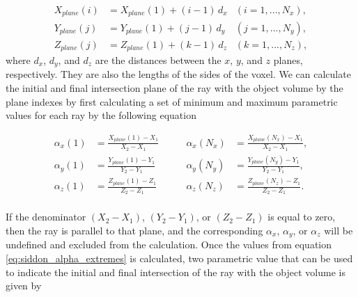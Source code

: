 \begin{equation}
	\begin{aligned}
		X_{plane}(i) & = X_{plane}(1) + (i-1)\, d_x 	&(i = 1, ..., N_x),\\ 
		Y_{plane}(j) & = Y_{plane}(1) + (j-1)\, d_y  	&(j = 1, ..., N_y),\\
		Z_{plane}(j) & = Z_{plane}(1) + (k-1)\, d_z		&(k = 1, ..., N_z),
	\end{aligned}
	\label{eq:siddon_planes}
\end{equation}
where $d_x$, $d_y$, and $d_z$ are the distances between the $x$, $y$, and $z$ planes, respectively.  They are also the lengths of the sides of the voxel.  We can calculate the initial and final intersection plane of the ray with the object volume by the plane indexes by first calculating a set of minimum and maximum parametric values for each ray by the following equation

\begin{equation}
\begin{aligned}
\alpha_x(1) &= \frac{X_{plane}(1) - X_1}{X_2 - X_1} \qquad &\alpha_x(N_x) &= \frac{X_{plane}(N_x) - X_1}{X_2 - X_1}, \\
\alpha_y(1) &= \frac{Y_{plane}(1) - Y_1}{Y_2 - Y_1} \qquad &\alpha_y(N_y) &= \frac{Y_{plane}(N_y) - Y_1}{Y_2 - Y_1}, \\
\alpha_z(1) &= \frac{Z_{plane}(1) - Z_1}{Z_2 - Z_1} \qquad &\alpha_z(N_z) &= \frac{Z_{plane}(N_z) - Z_1}{Z_2 - Z_1}. \\
\end{aligned}
\label{eq:siddon_alpha_extremes}
\end{equation}

If the denominator $(X_2 - X_1)$, $(Y_2-Y_1)$, or $(Z_2 - Z_1)$ is equal to zero, then the ray is parallel to that plane, and the corresponding $\alpha_x$, $\alpha_y$, or $\alpha_z$ will be undefined and excluded from the calculation.  Once the values from equation \ref{eq:siddon_alpha_extremes} is calculated, two parametric value that can be used to indicate the initial and final intersection of the ray with the object volume is given by 

